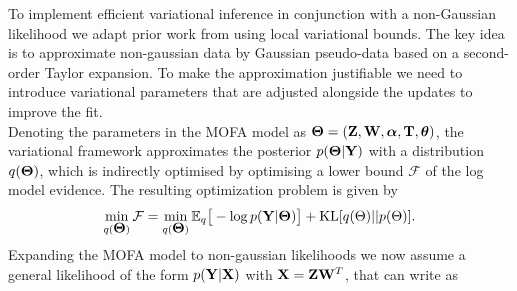 \documentclass[10pt, a4paper,openany]{report}
\begin{document}
To implement efficient variational inference in conjunction with a non-Gaussian likelihood we adapt prior work from \cite{seeger} using local variational bounds. The key idea is to approximate non-gaussian data by Gaussian pseudo-data based on a second-order Taylor expansion.  To make the approximation justifiable we need to introduce variational parameters that are adjusted alongside the updates to improve the fit.	\\
Denoting the parameters in the MOFA model as $\mbox{\boldmath $\Theta$}= ({\bf Z},{\bf W},\mbox{\boldmath $\alpha$},\mbox{\boldmath $\mathrm{T}$},\mbox{\boldmath $\theta$})$, the variational framework approximates the posterior $p(\mbox{\boldmath $\Theta$} | {\bf Y} )$ with a distribution $q(\mbox{\boldmath $\Theta$})$, which is indirectly optimised by optimising a lower bound $\mathcal{F}$ of the log model evidence. The resulting optimization problem is given by
\[
\min_{q(\mbox{\boldmath $\Theta$})} \mathcal{F} = \min_{q(\mbox{\boldmath $\Theta$})} \mathbb{E}_q \big[ -\log p({\bf Y}|\mbox{\boldmath $\Theta$}) \big] + {\rm KL}[q(\Theta)||p(\Theta)].
\]
Expanding the MOFA model to non-gaussian likelihoods we now assume a general likelihood of the form $p({\bf Y}|{\bf X})$ with ${\bf X} = {\bf Z}{\bf W}^{T}$, that can write as
\end{document}
